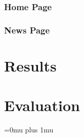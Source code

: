 \documentclass[a4paper, oneside, 11pt]{article}
\begin{document}
\begin{multicols*}{2}
  \subsubsection{Home Page} 
  \lipsum[1]


  \subsubsection{News Page}
  \lipsum[1]


  
  \section{Results}
  \lipsum[1]


  
  \section{Evaluation}
  \lipsum[1]



  \newpage


  \Urlmuskip=0mu plus 1mu\relax
  
  

\end{multicols*}
\end{document}
